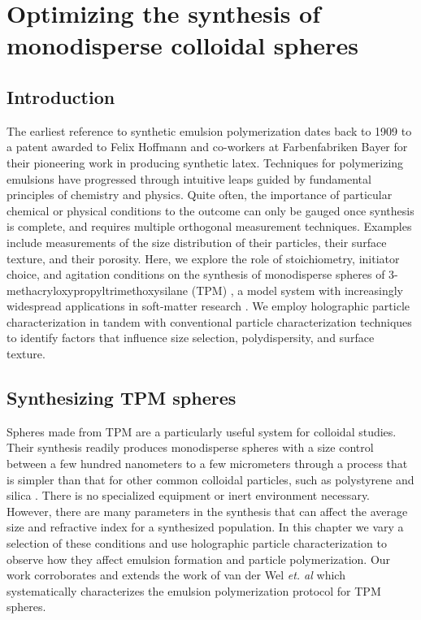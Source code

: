 \chapter{Optimizing the synthesis of monodisperse colloidal spheres}
\label{ch:synthesis}

\section{Introduction}

The earliest reference to synthetic emulsion polymerization dates back to
1909 \cite{bayer1909,finch03} to a patent awarded to Felix Hoffmann and
co-workers at Farbenfabriken Bayer for their pioneering work in producing
synthetic latex.
Techniques for polymerizing emulsions have progressed through
intuitive leaps guided by fundamental principles of chemistry
and physics.  Quite often, the importance of particular chemical
or physical conditions to the outcome can only be gauged once
synthesis is complete, and requires multiple orthogonal measurement
techniques. Examples include measurements of the size distribution
of their particles, their surface texture, and their porosity.
Here, we explore the role of stoichiometry, initiator choice, and
agitation conditions on the synthesis of monodisperse spheres of
\num{3}-methacryloxypropyltrimethoxysilane (TPM) \cite{vanderwel17},
a model system with increasingly widespread applications
in soft-matter research \cite{sacanna11,liu16,vanderwel18}.
We employ holographic particle characterization
in tandem with conventional particle characterization
techniques to identify factors that 
influence size selection, polydispersity, and surface texture.

\section{Synthesizing TPM spheres}

Spheres made from TPM are a particularly useful system for colloidal studies.
Their synthesis readily produces monodisperse spheres with a size control
between a few hundred nanometers to a few micrometers \cite{liu16} through a process 
that is simpler than that for other common colloidal particles, such 
as polystyrene \cite{goodwin1974} and silica \cite{stober68}. There is no specialized 
equipment or inert environment necessary. However, there are many 
parameters in the synthesis that can affect the average size and refractive
index for a synthesized population. In this chapter we vary a selection of these
conditions and use holographic particle characterization to observe how they affect
emulsion formation and particle polymerization. Our work corroborates and extends
the work of van der Wel \emph{et. al} \cite{vanderwel17} which systematically
characterizes the emulsion polymerization protocol for TPM spheres.

